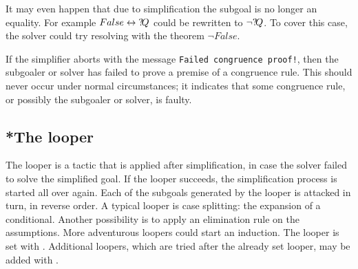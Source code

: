 It may even happen that due to simplification the subgoal is no longer
an equality.  For example $False \leftrightarrow {?\!Q}$ could be rewritten to
$\neg{?\!Q}$.  To cover this case, the solver could try resolving
with the theorem $\neg False$.

\begin{warn}
  If the simplifier aborts with the message {\tt Failed congruence
    proof!}, then the subgoaler or solver has failed to prove a
  premise of a congruence rule.  This should never occur under normal
  circumstances; it indicates that some congruence rule, or possibly
  the subgoaler or solver, is faulty.
\end{warn}


\subsection{*The looper}
The looper is a tactic that is applied after simplification, in case the
solver failed to solve the simplified goal.  If the looper succeeds, the
simplification process is started all over again.  Each of the subgoals
generated by the looper is attacked in turn, in reverse order.  A
typical looper is case splitting: the expansion of a conditional.  Another
possibility is to apply an elimination rule on the assumptions.  More
adventurous loopers could start an induction.  The looper is set with 
. Additional loopers, which are tried after the already set
looper, may be added with .


